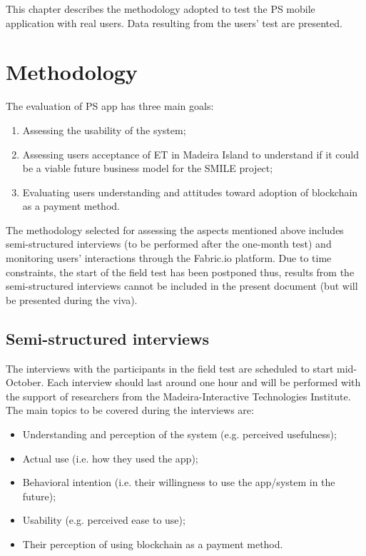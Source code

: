 \cleardoublepage
\label{chap:evaluation}
This chapter describes the methodology adopted to test the \ac{PS} mobile application with real users. Data resulting from the users’ test are presented. 

\section{Methodology}

The evaluation of \ac{PS} app has three main goals:


\begin{enumerate}
    \item Assessing the usability of the system;
    \item Assessing users acceptance of \ac{ET} in Madeira Island to understand if it could be a viable future business model for the SMILE project;
    \item Evaluating users understanding and attitudes toward adoption of blockchain as a payment method.
\end{enumerate}


The methodology selected for assessing the aspects mentioned above includes semi-structured interviews (to be performed after the one-month test) and monitoring users’ interactions through the Fabric.io platform. Due to time constraints, the start of the field test has been postponed thus, results from the semi-structured interviews cannot be included in the present document (but will be presented during the viva). 


\subsection{Semi-structured interviews}

The interviews with the participants in the field test are scheduled to start mid-October. Each interview should last around one hour and will be performed with the support of researchers from the Madeira-Interactive Technologies Institute.
The main topics to be covered during the interviews are:
\begin{itemize}
    \item Understanding and perception of the system (e.g. perceived usefulness);
    \item Actual use (i.e. how they used the app);
    \item Behavioral intention (i.e. their willingness to use the app/system in the future);
    \item Usability (e.g. perceived ease to use);
    \item Their perception of using blockchain as a payment method.
\end{itemize}

